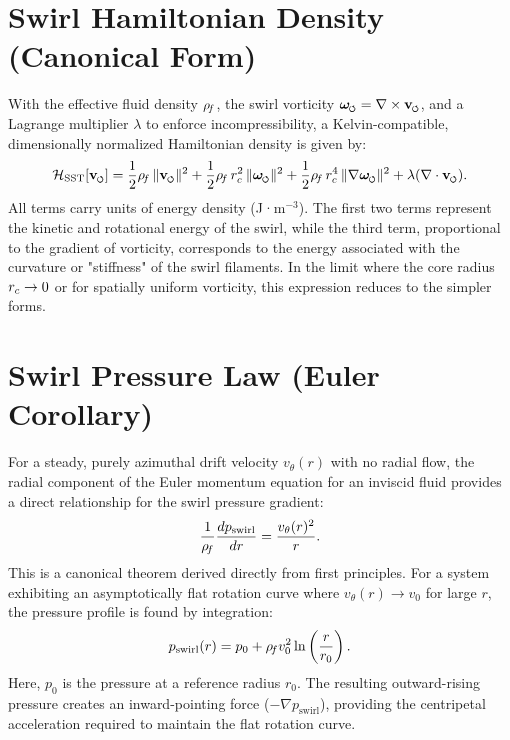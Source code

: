 \documentclass[11pt]{article}
\begin{document}
        \section{Swirl Hamiltonian Density (Canonical Form)}
        \label{sec:hamiltonian}
        With the effective fluid density \(\rho_{\!f}\), the swirl vorticity \(\omegas=\nabla\times \vswirl\), and a Lagrange multiplier \(\lambda\) to enforce incompressibility, a Kelvin-compatible, dimensionally normalized Hamiltonian density is given by:
        \begin{equation}
            \mathcal{H}_{\text{SST}}[\vswirl] = \frac{1}{2}\rhof\,\|\vswirl\|^2 + \frac{1}{2}\rhof\,\rc^2\,\|\omegas\|^2 + \frac{1}{2}\rhof\,\rc^4\,\|\nabla \omegas\|^2 + \lambda (\nabla\cdot \vswirl).
            \label{eq:Hamiltonian_SST}
        \end{equation}
        All terms carry units of energy density (J·m\(^{-3}\)). The first two terms represent the kinetic and rotational energy of the swirl, while the third term, proportional to the gradient of vorticity, corresponds to the energy associated with the curvature or "stiffness" of the swirl filaments. In the limit where the core radius \(r_c\to 0\) or for spatially uniform vorticity, this expression reduces to the simpler forms.

        \section{Swirl Pressure Law (Euler Corollary)}
        \label{sec:darkpressure}
        For a steady, purely azimuthal drift velocity $v_\theta(r)$ with no radial flow, the radial component of the Euler momentum equation for an inviscid fluid provides a direct relationship for the swirl pressure gradient:
        \begin{equation}
            \frac{1}{\rho_{\!f}}\frac{dp_{\text{swirl}}}{dr} = \frac{v_\theta(r)^2}{r}.
            \label{eq:swirl_pressure_law}
        \end{equation}
        This is a canonical theorem derived directly from first principles. For a system exhibiting an asymptotically flat rotation curve where $v_\theta(r) \to v_0$ for large $r$, the pressure profile is found by integration:
        \begin{equation}
            p_{\text{swirl}}(r) = p_0 + \rho_{\!f} v_0^2 \ln\left(\frac{r}{r_0}\right).
        \end{equation}
        Here, $p_0$ is the pressure at a reference radius $r_0$. The resulting outward-rising pressure creates an inward-pointing force ($-\nabla p_{\text{swirl}}$), providing the centripetal acceleration required to maintain the flat rotation curve.
\end{document}
